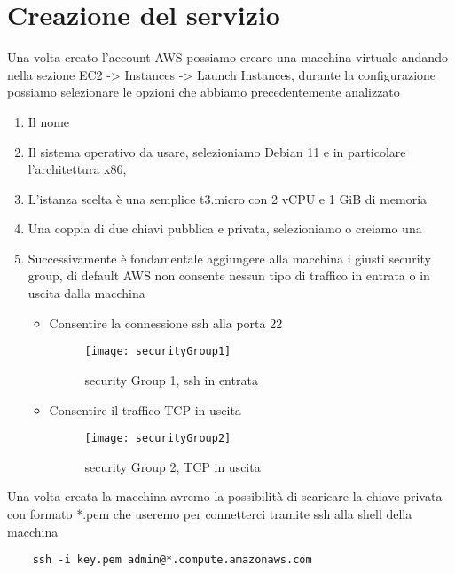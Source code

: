 \newpage
\section{Creazione del servizio}

Una volta creato l'account AWS possiamo creare una macchina virtuale andando nella sezione EC2 -> Instances -> Launch Instances, durante la configurazione possiamo selezionare le opzioni che abbiamo precedentemente analizzato
\begin{enumerate}
    \item Il nome
    \item Il sistema operativo da usare, selezioniamo Debian 11 e in particolare l'architettura x86,
    \item L'istanza scelta è una semplice t3.micro con 2 vCPU e 1 GiB di memoria
    \item Una coppia di due chiavi pubblica e privata, selezioniamo o creiamo una 
    \item Successivamente è fondamentale aggiungere alla macchina i giusti security group, di default AWS non consente nessun tipo di traffico in entrata o in uscita dalla macchina
    \begin{itemize}
        \item Consentire la connessione ssh alla porta 22
        \begin{figure}[h]
            \centering
            \texttt{[image: securityGroup1]}
            \caption{security Group 1, ssh in entrata}
            \label{fig:sec1}
        \end{figure}
        
        \item Consentire il traffico TCP in uscita
        \begin{figure}[h]
            \centering
            \texttt{[image: securityGroup2]}
            \caption{security Group 2, TCP in uscita}
            \label{fig:sec2}
        \end{figure}
    \end{itemize}
\end{enumerate}


Una volta creata la macchina avremo la possibilità di scaricare la chiave privata con formato *.pem che useremo per connetterci tramite ssh alla shell della macchina
\begin{lstlisting}
    ssh -i key.pem admin@*.compute.amazonaws.com
\end{lstlisting}

